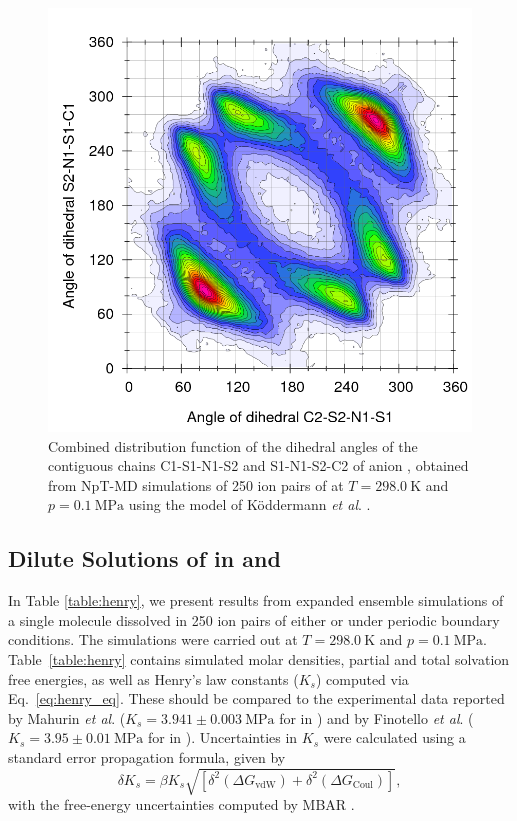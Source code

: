 \documentclass[3p,twocolumn]{elsarticle}
\begin{document}
\begin{figure}
\centering
\includegraphics[width=\linewidth]{Ludwig_anion}
\caption{Combined distribution function of the dihedral angles of the contiguous chains C1-S1-N1-S2 and S1-N1-S2-C2 of anion \ce{[NTf_2]^-}, obtained from NpT-MD simulations of 250 ion pairs of \ce{[emim][NTf_2]} at $T = 298.0~\mathrm{K}$ and $p = 0.1~\mathrm{MPa}$ using the model of K\"{o}ddermann \textit{et al}. \cite{Koddermann_2007}.}
\label{fig:die_ntf2}
\end{figure}

\subsection{Dilute Solutions of  in \ce{[emim][B(CN)_4]} and \ce{[emim][NTf_2]}}
\label{sec:henry_results}

In Table \ref{table:henry}, we present results from expanded ensemble simulations of a single  molecule dissolved in 250 ion pairs of either \ce{[emim][B(CN)_4]} or \ce{[emim][NTf_2]} under periodic boundary conditions.
The simulations were carried out at $T = 298.0~\mathrm{K}$ and $p = 0.1~\mathrm{MPa}$.
Table~\ref{table:henry} contains simulated molar densities, partial and total solvation free energies, as well as Henry's law constants ($K_s$) computed via Eq.~\eqref{eq:henry_eq}. These should be compared to the experimental data reported by Mahurin \textit{et al}. \cite{Mahurin_2010} ($K_s = 3.941 \pm 0.003 ~\mathrm{MPa}$ for  in \ce{[emim][B(CN)_4]}) and by Finotello \textit{et al}. \cite{Finotello_2008} ($K_s = 3.95 \pm 0.01 ~\mathrm{MPa}$ for  in \ce{[emim][NTf_2]}).
Uncertainties in $K_s$ were calculated using a standard error propagation formula, given by
\begin{equation}
\delta K_s = \beta K_s \sqrt{\left[ \delta^2 (\Delta G_{\text{vdW}}) + \delta^2(\Delta G_{\text{Coul}}) \right]},
\end{equation}
with the free-energy uncertainties computed by MBAR \cite{Shirts_2008}.
\end{document}
